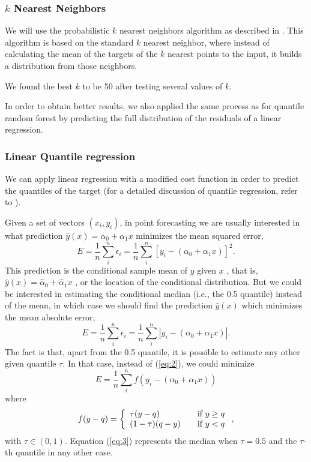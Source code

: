 \documentclass[a4paper,twocolumn,5p]{elsarticle}
\begin{document}
\subsubsection{$k$ Nearest Neighbors}

We will use the probabilistic $k$ nearest neighbors algorithm as described in  
\cite{quantileknnmangalova}. 
This algorithm is based on the standard $k$ nearest neighbor, 
where instead of calculating the mean of 
the targets of the
$k$ nearest points to the input, it builds a distribution 
from those neighbors.

We found the best $k$ to be 50 after testing several values of $k$.

In order to obtain better results, we also applied the same process as for 
quantile random forest by predicting the full distribution of the residuals 
of a linear regression.

\subsubsection{Linear Quantile regression}

We can apply linear regression with a modified cost function in order to 
predict the quantiles of the target (for a detailed discussion of 
quantile regression, refer to \cite{koenker_quantile_2001}). 

Given a 
set of vectors $(x_i, y_i)$, in point forecasting we are usually 
interested in what prediction $\hat y(x) = \alpha_0 + \alpha_1 x$
minimizes the mean squared error,
\begin{equation}
  \label{eq:1}
  E = \frac{1}{n} \sum^n_i \epsilon_i =
  \frac{1}{n} \sum^n_i [ y_i - (\alpha_0 + \alpha_1 x) ]^2.
\end{equation}
This prediction is the conditional sample mean of $y$ given $x$ , that
 is, $\hat y(x) = \hat\alpha_0 + \hat\alpha_1 x$
, or the location of the conditional distribution. But we could be
interested in estimating the conditional median (i.e., the 0.5
quantile) instead of the mean, in which case we should find the
prediction $\hat y(x)$ which minimizes the mean absolute error,
\begin{equation}
  \label{eq:2}
  E = \frac{1}{n} \sum^n_i \epsilon_i =
  \frac{1}{n} \sum^n_i | y_i - (\alpha_0 + \alpha_1 x) |.
\end{equation}
The fact is that, apart from the 0.5 quantile, it is possible to
estimate any other given quantile $\tau$. In that case, instead of
(\ref{eq:2}), we could minimize
\begin{equation}
  \label{eq:3}
E= \frac{1}{n} \sum^n_i f( y_i - (\alpha_0 + \alpha_1 x))
\end{equation}
where
\begin{equation}
  \label{eq:4}
  f(y-q) = \left\{ 
\begin{array}{l l}
\tau (y-q) & \quad \mbox{if $y \ge q$}\\
(1-\tau) (q-y) & \quad \mbox{if $y < q$}\\
\end{array} \right.,
\end{equation}
with $\tau \in (0,1)$. Equation (\ref{eq:3}) represents the
median when $\tau=0.5$ and the $\tau$-th quantile in any other case.
\end{document}
